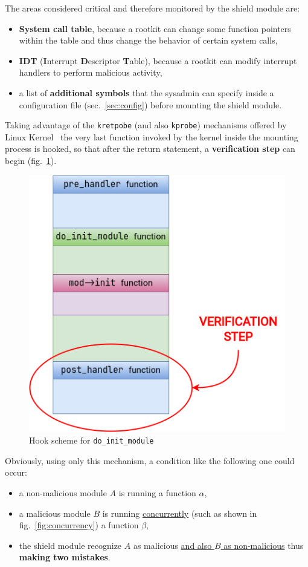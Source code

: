 \documentclass{article}
\begin{document}
	The areas considered critical and therefore monitored by the shield module are:
	\begin{itemize}
		\item \textbf{System call table}, because a rootkit can change some function pointers within the table and thus
		change the behavior of certain system calls,
		\item \textbf{IDT} (\textbf{I}nterrupt \textbf{D}escriptor \textbf{T}able), because a rootkit can modify
		interrupt handlers to perform malicious activity,
		\item a list of \textbf{additional symbols} that the sysadmin can specify inside a configuration file
		(sec.~\ref{sec:config}) before mounting the shield module.
	\end{itemize}

	Taking advantage of the \texttt{kretpobe} (and also \texttt{kprobe}) mechanisms offered by Linux
	Kernel~\cite{doc:kprobe} the very last function invoked by the kernel inside the mounting process is hooked, so
	that after the return statement, a \textbf{verification step} can begin (fig.~\ref{fig:monitoring}).

	\begin{figure}[!htbp]
		\centering
		\includegraphics[scale=0.4]{monitoring}
		\caption{Hook scheme for \texttt{do\_init\_module}}
		\label{fig:monitoring}
	\end{figure}

	Obviously, using only this mechanism, a condition like the following one could occur:
	\begin{itemize}
		\item a non-malicious module $A$ is running a function $\alpha$,
		\item a malicious module $B$ is running \ul{concurrently} (such as shown in fig.~\ref{fig:concurrency}) a
		function $\beta$,
		\item the shield module recognize $A$ as malicious \ul{and also $B$ as non-malicious} thus \textbf{making two
		mistakes}.
	\end{itemize}
\end{document}
